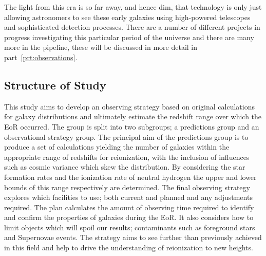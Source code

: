 	The light from this era is so far away, and hence dim, that technology is only just allowing astronomers to see these early galaxies using high-powered telescopes and sophisticated detection processes. There are a number of different projects in progress investigating this particular period of the universe and there are many more in the pipeline, these will be discussed in more detail in part~\ref{prt:observations}.

    \subsection{Structure of Study} %
    \label{Structure_of_Study}
		This study aims to develop an observing strategy based on original calculations for galaxy distributions and ultimately estimate the redshift range over which the EoR occurred. The group is split into two subgroups; a predictions group and an observational strategy group. The principal aim of the predictions group is to produce a set of calculations yielding the number of galaxies within the appropriate range of redshifts for reionization, with the inclusion of influences such as cosmic variance which skew the distribution. By considering the star formation rates and the ionization rate of neutral hydrogen the upper and lower bounds of this range respectively are determined. The final observing strategy explores which facilities to use; both current and planned and any adjustments required. The plan calculates the amount of observing time required to identify and confirm the properties of galaxies during the EoR. It also considers how to limit objects which will spoil our results; contaminants such as foreground stars and Supernovae events. The strategy aims to see further than previously achieved in this field and help to drive the understanding of reionization to new heights.
